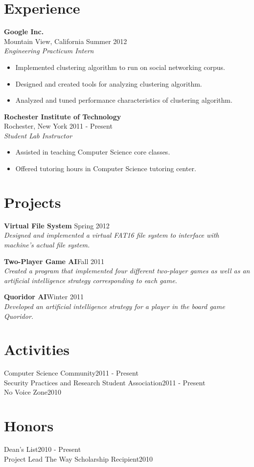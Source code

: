 \documentclass[margin]{res}
\begin{document}
\begin{resume}
\section{Experience}
\textbf{Google Inc.} \\
Mountain View, California \hfill Summer 2012 \\
\emph{Engineering Practicum Intern}
\begin{itemize}
  \setlength{\itemsep}{-2pt}
  \item Implemented clustering algorithm to run on social networking corpus.
  \item Designed and created tools for analyzing clustering algorithm.
  \item Analyzed and tuned performance characteristics of clustering algorithm.
\end{itemize}

\textbf{Rochester Institute of Technology} \\
Rochester, New York \hfill 2011 - Present \\
\emph{Student Lab Instructor}
\begin{itemize}
  \setlength{\itemsep}{-2pt}
  \item Assisted in teaching Computer Science core classes.
  \item Offered tutoring hours in Computer Science tutoring center. 
\end{itemize}


\section{Projects}
\textbf{Virtual File System} \hfill Spring 2012 \\
\emph{Designed and implemented a virtual FAT16 file system to interface with
machine's actual file system.}

\textbf{Two-Player Game AI}\hfill Fall 2011 \\
\emph{Created a program that implemented four different two-player games as
well as an artificial intelligence strategy corresponding to each game.}

\textbf{Quoridor AI}\hfill Winter 2011 \\
\emph{Developed an artificial intelligence strategy for a player in the board
game Quoridor.}


\section{Activities}
Computer Science Community\hfill 2011 - Present \\
Security Practices and Research Student Association\hfill 2011 - Present \\
No Voice Zone\hfill 2010


\section{Honors}
Dean's List\hfill 2010 - Present \\
Project Lead The Way Scholarship Recipient\hfill 2010

\end{resume}
\end{document}
